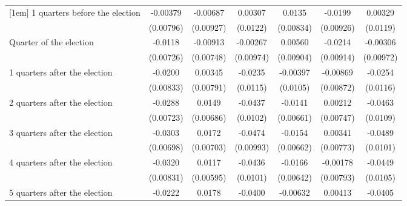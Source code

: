 \begin{table}[htbp]
\begin{tabular}{l*{6}{c}}
[1em]
 1 quarters before the election&    -0.00379         &    -0.00687         &     0.00307         &      0.0135         &     -0.0199\sym{*}  &     0.00329         \\
                    &   (0.00796)         &   (0.00927)         &    (0.0122)         &   (0.00834)         &   (0.00926)         &    (0.0119)         \\
[1em]
Quarter of the election&     -0.0118         &    -0.00913         &    -0.00267         &     0.00560         &     -0.0214\sym{*}  &    -0.00306         \\
                    &   (0.00726)         &   (0.00748)         &   (0.00974)         &   (0.00904)         &   (0.00914)         &   (0.00972)         \\
[1em]
 1 quarters after the election&     -0.0200\sym{*}  &     0.00345         &     -0.0235\sym{*}  &    -0.00397         &    -0.00869         &     -0.0254\sym{*}  \\
                    &   (0.00833)         &   (0.00791)         &    (0.0115)         &    (0.0105)         &   (0.00872)         &    (0.0116)         \\
[1em]
 2 quarters after the election&     -0.0288\sym{***}&      0.0149\sym{*}  &     -0.0437\sym{***}&     -0.0141\sym{*}  &     0.00212         &     -0.0463\sym{***}\\
                    &   (0.00723)         &   (0.00686)         &    (0.0102)         &   (0.00661)         &   (0.00747)         &    (0.0109)         \\
[1em]
 3 quarters after the election&     -0.0303\sym{***}&      0.0172\sym{*}  &     -0.0474\sym{***}&     -0.0154\sym{*}  &     0.00341         &     -0.0489\sym{***}\\
                    &   (0.00698)         &   (0.00703)         &   (0.00993)         &   (0.00662)         &   (0.00773)         &    (0.0101)         \\
[1em]
 4 quarters after the election&     -0.0320\sym{***}&      0.0117         &     -0.0436\sym{***}&     -0.0166\sym{**} &    -0.00178         &     -0.0449\sym{***}\\
                    &   (0.00831)         &   (0.00595)         &    (0.0101)         &   (0.00642)         &   (0.00793)         &    (0.0105)         \\
[1em]
 5 quarters after the election&     -0.0222\sym{**} &      0.0178         &     -0.0400\sym{**} &    -0.00632         &     0.00413         &     -0.0405\sym{**} \\

\end{tabular}
\end{table}
